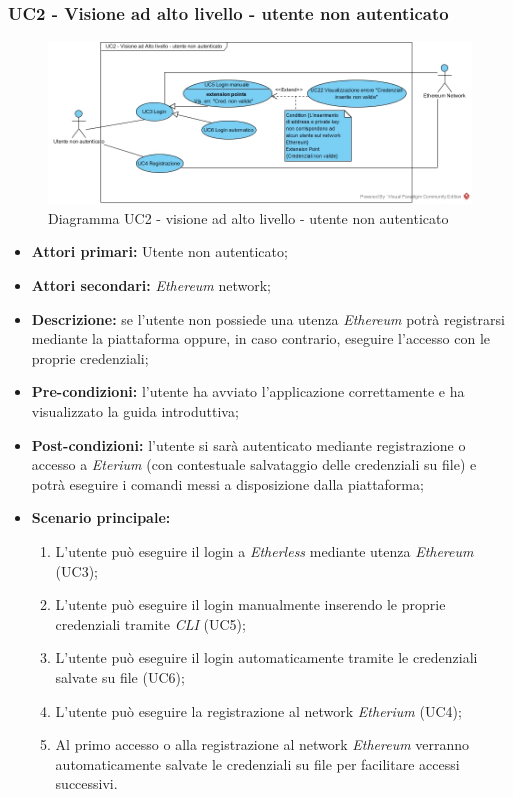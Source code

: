 \subsubsection{UC2 - Visione ad alto livello - utente non autenticato}
\begin{figure}[h]
	\centering
	\includegraphics[width=\linewidth]{res/img/UC2.jpg}
	\caption{Diagramma UC2 - visione ad alto livello - utente non autenticato}
\end{figure}
\begin{itemize}
	\item \textbf{Attori primari:} Utente non autenticato;
	\item \textbf{Attori secondari:} \textit{Ethereum\glo} network;
	\item \textbf{Descrizione:} se l'utente non possiede una utenza \textit{Ethereum\glo} potrà registrarsi mediante la piattaforma oppure, in caso contrario, eseguire l'accesso con le proprie credenziali;
	\item \textbf{Pre-condizioni:} l'utente ha avviato l'applicazione correttamente e ha visualizzato la guida introduttiva;
	\item \textbf{Post-condizioni:} l'utente si sarà autenticato mediante registrazione o accesso a \textit{Eterium\glo} (con contestuale salvataggio delle credenziali su file) e potrà eseguire i comandi messi a disposizione dalla piattaforma;
	\item \textbf{Scenario principale:}
	\begin{enumerate}
		\item L'utente può eseguire il login a \textit{Etherless} mediante utenza \textit{Ethereum\glo} (UC3);
		\item L'utente può eseguire il login manualmente inserendo le proprie credenziali tramite \textit{CLI\glo} (UC5);
		\item L'utente può eseguire il login automaticamente tramite le credenziali salvate su file (UC6);
		\item L'utente può eseguire la registrazione al network \textit{Etherium\glo} (UC4);
		\item Al primo accesso o alla registrazione al network \textit{Ethereum\glo} verranno automaticamente salvate le credenziali su file per facilitare accessi successivi.
	\end{enumerate}
\end{itemize}
